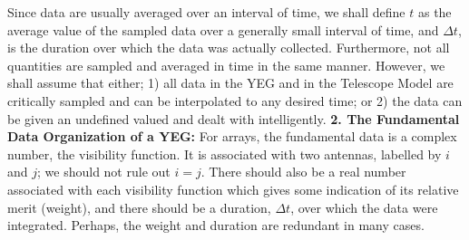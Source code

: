 Since data are usually averaged over an interval of time, we shall
define $t$ as the average value of the sampled data over a generally
small interval of time, and $\Delta t$, is the duration over which the
data was actually collected.  Furthermore, not all quantities are
sampled and averaged in time in the same manner.  However, we shall
assume that either; 1) all data in the YEG and in the Telescope Model
are critically sampled and can be interpolated to any desired time; or
2) the data can be given an undefined valued and dealt with
intelligently.
\bn
{\bf 2. The Fundamental Data Organization of a YEG:}
\m
For arrays, the fundamental data is a complex number, the visibility
function.  It is associated with two antennas, labelled by $i$ and
$j$; we should not rule out $i=j$.  There should also be a real number
associated with each visibility function which gives some indication
of its relative merit (weight), and there should be a duration,
$\Delta t$, over which the data were integrated.  Perhaps, the weight
and duration are redundant in many cases.


